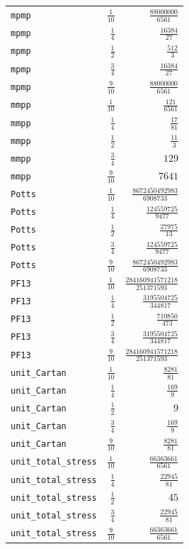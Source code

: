 \begin{longtable}{lrr}
\texttt{mpmp} & $\frac{1}{10}$ & $\frac{88000000}{6561}$\\
\texttt{mpmp} & $\frac{1}{4}$ & $\frac{16384}{27}$\\
\texttt{mpmp} & $\frac{1}{2}$ & $\frac{512}{3}$\\
\texttt{mpmp} & $\frac{3}{4}$ & $\frac{16384}{27}$\\
\texttt{mpmp} & $\frac{9}{10}$ & $\frac{88000000}{6561}$\\
\texttt{mmpp} & $\frac{1}{10}$ & $\frac{121}{6561}$\\
\texttt{mmpp} & $\frac{1}{4}$ & $\frac{17}{81}$\\
\texttt{mmpp} & $\frac{1}{2}$ & $\frac{11}{3}$\\
\texttt{mmpp} & $\frac{3}{4}$ & $129$\\
\texttt{mmpp} & $\frac{9}{10}$ & $7641$\\
\texttt{Potts} & $\frac{1}{10}$ & $\frac{8672450492983}{6908733}$\\
\texttt{Potts} & $\frac{1}{4}$ & $\frac{124559725}{9477}$\\
\texttt{Potts} & $\frac{1}{2}$ & $\frac{27975}{13}$\\
\texttt{Potts} & $\frac{3}{4}$ & $\frac{124559725}{9477}$\\
\texttt{Potts} & $\frac{9}{10}$ & $\frac{8672450492983}{6908733}$\\
\texttt{PF13} & $\frac{1}{10}$ & $\frac{284160941571218}{251371593}$\\
\texttt{PF13} & $\frac{1}{4}$ & $\frac{3195504725}{344817}$\\
\texttt{PF13} & $\frac{1}{2}$ & $\frac{710850}{473}$\\
\texttt{PF13} & $\frac{3}{4}$ & $\frac{3195504725}{344817}$\\
\texttt{PF13} & $\frac{9}{10}$ & $\frac{284160941571218}{251371593}$\\
\texttt{unit\_Cartan} & $\frac{1}{10}$ & $\frac{8281}{81}$\\
\texttt{unit\_Cartan} & $\frac{1}{4}$ & $\frac{169}{9}$\\
\texttt{unit\_Cartan} & $\frac{1}{2}$ & $9$\\
\texttt{unit\_Cartan} & $\frac{3}{4}$ & $\frac{169}{9}$\\
\texttt{unit\_Cartan} & $\frac{9}{10}$ & $\frac{8281}{81}$\\
\texttt{unit\_total\_stress} & $\frac{1}{10}$ & $\frac{66363661}{6561}$\\
\texttt{unit\_total\_stress} & $\frac{1}{4}$ & $\frac{22945}{81}$\\
\texttt{unit\_total\_stress} & $\frac{1}{2}$ & $45$\\
\texttt{unit\_total\_stress} & $\frac{3}{4}$ & $\frac{22945}{81}$\\
\texttt{unit\_total\_stress} & $\frac{9}{10}$ & $\frac{66363661}{6561}$\\
\end{longtable}
\endgroup

